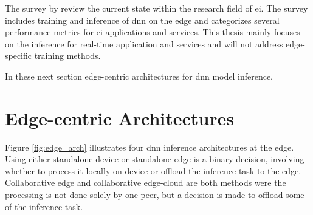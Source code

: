 The survey  by \citet{zhou_edge_2019} review the current state within the research field of \gls{ei}. The survey includes training and inference of \gls{dnn} on the edge and categorizes several performance metrics for \gls{ei} applications and services. This thesis mainly focuses on the inference for real-time application and services and will not address edge-specific training methods. 

In these next section edge-centric architectures for \gls{dnn} model inference.

\newpage
\section{Edge-centric Architectures} \label{sec:ei-architecture}

Figure \ref{fig:edge_arch} illustrates four \gls{dnn} inference architectures at the edge. Using either standalone device  \protect{} or standalone edge \protect{} is a binary decision, involving whether to process it locally on device or offload the inference task to the edge. Collaborative edge\protect{} and collaborative edge-cloud \protect{} are both methods were the processing is not done solely by one peer, but a decision is made to offload some of the inference task.
